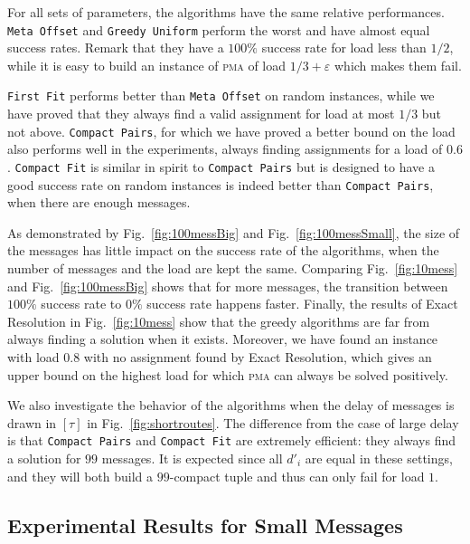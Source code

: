 \documentclass[a4paper,UKenglish,cleveref, autoref, thm-restate]{lipics-v2019}
\newcommand\pma{\textsc{pma}\xspace}
\newcommand\firstfit{\texttt{First Fit}\xspace}
\newcommand\compactpair{\texttt{Compact Pairs}\xspace}
\newcommand\metaoffset{\texttt{Meta Offset}\xspace}
\newcommand\greedyuniform{\texttt{Greedy Uniform}\xspace}
\newcommand\compactfit{\texttt{Compact Fit}\xspace}
\begin{document}
\medskip

For all sets of parameters, the algorithms have the same relative performances. \metaoffset and \greedyuniform perform the worst and have almost equal success rates. Remark that they have a $100\%$ success rate for load less than $1/2$, while it is easy to build an instance of \pma of load $1/3 +\varepsilon$ which makes them fail. 

\firstfit performs better than \metaoffset on random instances, while we have proved that
they always find a valid assignment for load at most $1/3$ but not above.
 \compactpair, for which we have proved a better bound on the load also performs well in the experiments, always finding assignments for a load of $0.6$. \compactfit is similar in spirit to \compactpair but is designed to have a good success rate on random instances is indeed better than \compactpair, when there are enough messages.

As demonstrated by Fig.~\ref{fig:100messBig} and Fig.~\ref{fig:100messSmall}, the size of the messages has little impact on the success rate of the algorithms, when the number of messages and the load are kept the same. Comparing Fig.~\ref{fig:10mess} and Fig.~\ref{fig:100messBig} shows that for more messages, the transition between $100\%$ success rate to $0\%$ success rate happens faster.
Finally, the results of Exact Resolution in Fig.~\ref{fig:10mess} show that the greedy algorithms are far from always finding a solution when it exists. Moreover, we have found an instance with load $0.8$ with no assignment found by Exact Resolution, which gives an upper bound on the highest load for which \pma can always be solved positively.

We also investigate the behavior of the algorithms when the delay of messages is drawn in $[\tau]$ in Fig.~\ref{fig:shortroutes}. The difference from the case of large delay is that \compactpair and \compactfit are extremely efficient: they always find a solution for $99$ messages. It is expected since all $d'_i$ are equal in these settings, and they will both build a $99$-compact tuple and thus can only fail for load $1$.

\subsection{Experimental Results for Small Messages} \label{sec:perf_small}
\end{document}
